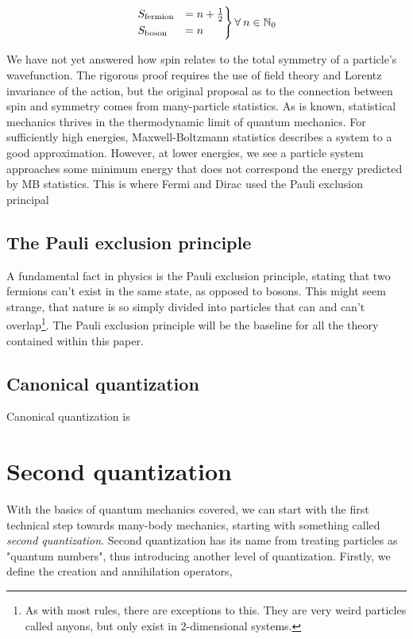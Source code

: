 \documentclass[10pt]{report}
\begin{document}
	\begin{equation}
		\begin{rcases}
		S_{\text{fermion}} &= n + \frac{1}{2}\\
		S_{\text{boson}} &= n
		\end{rcases} \forall\:n\in\mathbb{N}_0
	\end{equation}
	
	We have not yet answered how spin relates to the total symmetry of a particle's wavefunction. The rigorous proof requires the use of field theory and Lorentz invariance of the action, but the original proposal as to the connection between spin and symmetry comes from many-particle statistics. As is known, statistical mechanics thrives in the thermodynamic limit of quantum mechanics. For sufficiently high energies, Maxwell-Boltzmann statistics describes a system to a good approximation. However, at lower energies, we see a particle system approaches some minimum energy that does not correspond the energy predicted by MB statistics. This is where Fermi and Dirac used the Pauli exclusion principal
	
	\subsection{The Pauli exclusion principle}
	A fundamental fact in physics is the Pauli exclusion principle, stating that two fermions can't exist in the same state, as opposed to bosons. This might seem strange, that nature is so simply divided into particles that can and can't overlap\footnote{As with most rules, there are exceptions to this. They are very weird particles called anyons, but only exist in 2-dimensional systems.}. The Pauli exclusion principle will be the baseline for all the theory contained within this paper.
	
	\subsection{Canonical quantization}
	Canonical quantization is 
	
	\section{Second quantization}
	
	With the basics of quantum mechanics covered, we can start with the first technical step towards many-body mechanics, starting with something called \emph{second quantization}. Second quantization has its name from treating particles as "quantum numbers", thus introducing another level of quantization. Firstly, we define the creation and annihilation operators,
	
\end{document}
